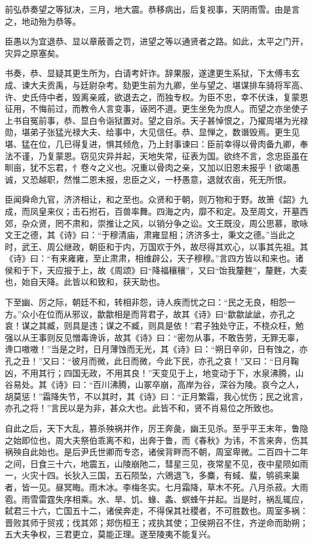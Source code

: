 \documentclass[12pt,UTF8]{ctexbook}
\begin{document}
前弘恭奏望之等狱决，三月，地大震。恭移病出，后复视事，天阴雨雪。由是言之，地动殆为恭等。



臣愚以为宜退恭、显以章蔽善之罚，进望之等以通贤者之路。如此，太平之门开，灾异之原塞矣。



书奏，恭、显疑其更生所为，白请考奸诈。辞果服，遂逮更生系狱，下太傅韦玄成、谏大夫贡禹，与廷尉杂考。劾更生前为九卿，坐与望之、堪谋排车骑将军高、许、史氏侍中者，毁离亲戚，欲退去之，而独专权。为臣不忠，幸不伏诛，复蒙恩征用，不悔前过，而教令人言变事，诬罔不道。更生坐免为庶人。而望之亦坐使子上书自冤前事，恭、显白令诣狱置对。望之自杀。天子甚悼恨之，乃擢周堪为光禄勋，堪弟子张猛光禄大夫、给事中，大见信任。恭、显惮之，数谮毁焉。更生见堪、猛在位，几已得复进，惧其倾危，乃上封事谏曰：臣前幸得以骨肉备九卿，奉法不谨，乃复蒙恩。窃见灾异并起，天地失常，征表为国。欲终不言，念忠臣虽在甽亩，犹不忘君，忄卷々之义也。况重以骨肉之亲，又加以旧恩未报乎！欲竭愚诚，又恐越职，然惟二恩未报，忠臣之义，一杼愚意，退就农亩，死无所恨。



臣闻舜命九官，济济相让，和之至也。众贤和于朝，则万物和于野。故箫《韶》九成，而凤皇来仪；击石拊石，百兽率舞。四海之内，靡不和定。及至周文，开墓西郊，杂众贤，罔不肃和，崇推让之风，以销分争之讼。文王既没，周公思慕，歌咏文王之德，其《诗》曰：“于穆清庙，肃雍显相；济济多士，秉文之德。”当此之时，武王、周公继政，朝臣和于内，万国欢于外，故尽得其欢心，以事其先祖。其《诗》曰：“有来雍雍，至止肃肃，相维辟公，天子穆穆。”言四方皆以和来也。诸侯和于下，天应报于上，故《周颂》曰“降福穰穰”，又曰“饴我釐麰”，釐麰，大麦也，始自天降。此皆以和致和，获天助也。



下至幽、厉之际，朝廷不和，转相非怨，诗人疾而忧之曰：“民之无良，相怨一方。”众小在位而从邪议，歙歙相是而背君子，故其《诗》曰“歙歙訿訿，亦孔之哀！谋之其臧，则具是违；谋之不臧，则具是依！”君子独处守正，不桡众枉，勉强以从王事则反见憎毒谗诉，故其《诗》曰：“密勿从事，不敢告劳，无罪无辜，谗口嗷嗷！”当是之时，日月薄蚀而无光，其《诗》曰：“朔日辛卯，日有蚀之，亦孔之丑！”又曰：“彼月而微，此日而微，今此下民，亦孔之哀！”又曰：“日月鞠凶，不用其行；四国无政，不用其良！”天变见于上，地变动于下，水泉沸腾，山谷易处。其《诗》曰：“百川沸腾，山冢卒崩，高岸为谷，深谷为陵。哀今之人，胡莫惩！”霜降失节，不以其时，其《诗》曰：“正月繁霜，我心忧伤；民之讹言，亦孔之将！”言民以是为非，甚众大也。此皆不和，贤不肖易位之所致也。



自此之后，天下大乱，篡杀殃祸并作，厉王奔彘，幽王见杀。至乎平王末年，鲁隐之始即位也，周大夫祭伯乖离不和，出奔于鲁，而《春秋》为讳，不言来奔，伤其祸殃自此始也。是后尹氏世卿而专恣，诸侯背畔而不朝，周室卑微。二百四十二年之间，日食三十六，地震五，山陵崩阤二，彗星三见，夜常星不见，夜中星陨如雨一，火灾十四。长狄入三国，五石陨坠，六鶂退飞，多麋，有蜮、蜚，鸲鹆来巢者，皆一见。昼冥晦。雨木冰。李梅冬实。七月霜降，草木不死。八月杀菽。大雨雹。雨雪雷霆失序相乘。水、旱、饥、蝝、螽、螟蜂午并起。当是时，祸乱辄应，弑君三十六，亡国五十二，诸侯奔走，不得保其社稷者，不可胜数也。周室多祸：晋败其师于贸戎；伐其郊；郑伤桓王；戎执其使；卫侯朔召不住，齐逆命而助朔；五大夫争权，三君更立，莫能正理。遂至陵夷不能复兴。
\end{document}
